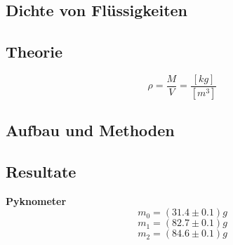 \documentclass[12pt,a4paper]{article}
\begin{document}
\begin{multicols}{2}




%			
%

\section{Dichte von Flüssigkeiten}

\subsection{Theorie}

$$\rho = \frac{M}{V} = \frac{[kg]}{[m^3]}$$

\subsection{Aufbau und Methoden}

\subsection{Resultate}

\textbf{Pyknometer}
$$m_0 = (31.4 \pm 0.1)g$$
$$m_1 = (82.7 \pm 0.1)g$$
$$m_2 = (84.6 \pm 0.1)g$$


\end{multicols}
\end{document}
